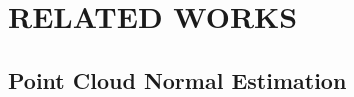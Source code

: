 \documentclass[letterpaper, 10 pt, conference]{ieeeconf}  %
\begin{document}

\section[sec:related_work]{RELATED WORKS} %
\label{sec:related_work}

\subsection{Point Cloud Normal Estimation}

\end{document}
